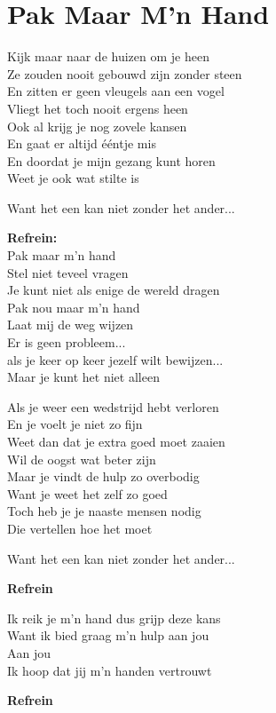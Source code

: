 \section{Pak Maar M'n Hand}
Kijk maar naar de huizen om je heen\\
Ze zouden nooit gebouwd zijn zonder steen\\
En zitten er geen vleugels aan een vogel\\
Vliegt het toch nooit ergens heen\\
Ook al krijg je nog zovele kansen\\
En gaat er altijd ééntje mis\\
En doordat je mijn gezang kunt horen\\
Weet je ook wat stilte is

Want het een kan niet zonder het ander...

\textbf{Refrein:}\\
Pak maar m'n hand\\
Stel niet teveel vragen\\
Je kunt niet als enige de wereld dragen\\
Pak nou maar m'n hand\\
Laat mij de weg wijzen\\
Er is geen probleem...\\
als je keer op keer jezelf wilt bewijzen...\\
Maar je kunt het niet alleen

Als je weer een wedstrijd hebt verloren\\
En je voelt je niet zo fijn\\
Weet dan dat je extra goed moet zaaien\\
Wil de oogst wat beter zijn\\
Maar je vindt de hulp zo overbodig\\
Want je weet het zelf zo goed\\
Toch heb je je naaste mensen nodig\\
Die vertellen hoe het moet

Want het een kan niet zonder het ander...

\textbf{Refrein}

Ik reik je m'n hand dus grijp deze kans\\
Want ik bied graag m'n hulp aan jou\\
Aan jou\\
Ik hoop dat jij m'n handen vertrouwt

\textbf{Refrein}